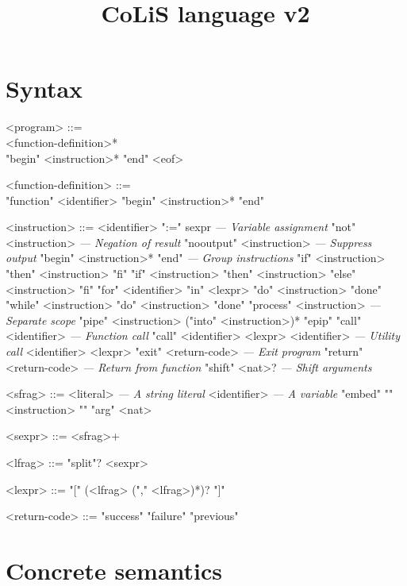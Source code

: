 \documentclass{scrartcl}
\title{CoLiS language v2}
\newcommand{\astcomment}[1]{\emph{\hfill --- #1}} %
\begin{document}
\section*{Syntax}

\begin{grammar}
  <program> ::= \hspace{0pt}\\
  <function-definition>* \\"begin" <instruction>* "end" <eof>

  <function-definition> ::= \hspace{0pt}\\
    "function" <identifier> "begin" <instruction>* "end"

  <instruction> ::= \hspace{0pt}
  \alt <identifier> ":=" sexpr \astcomment{Variable assignment}
  \alt "not" <instruction> \astcomment{Negation of result}
  \alt "nooutput" <instruction> \astcomment{Suppress output}
  \alt "begin" <instruction>* "end" \astcomment{Group instructions}
  \alt "if" <instruction> "then" <instruction> "fi"
  \alt "if" <instruction> "then" <instruction> "else" <instruction> "fi"
  \alt "for" <identifier> "in" <lexpr> "do" <instruction> "done"
  \alt "while" <instruction> "do" <instruction> "done"
  \alt "process" <instruction> \astcomment{Separate scope}
  \alt "pipe" <instruction> ("into" <instruction>)* "epip"
  \alt "call" <identifier> \astcomment{Function call}
  \alt "call" <identifier> <lexpr>
  \alt <identifier> \astcomment{Utility call}
  \alt <identifier> <lexpr>
  \alt "exit" <return-code> \astcomment{Exit program}
  \alt "return" <return-code> \astcomment{Return from function}
  \alt "shift" <nat>? \astcomment{Shift arguments}

  <sfrag> ::= \hspace{0pt}
  \alt <literal> \astcomment{A string literal}
  \alt <identifier> \astcomment{A variable}
  \alt "embed" "{" <instruction> "}"
  \alt "arg" <nat>

  <sexpr> ::= <sfrag>+

  <lfrag> ::= "split"? <sexpr>

  <lexpr> ::= "[" (<lfrag> ("," <lfrag>)*)? "]"

  <return-code> ::= \hspace{0pt}
  \alt "success"
  \alt "failure"
  \alt "previous"
\end{grammar}

\section*{Concrete semantics}
\end{document}
